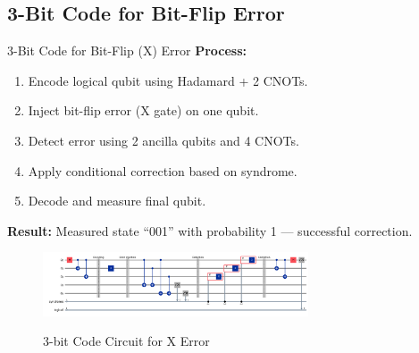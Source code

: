 \documentclass[10pt]{beamer}
\begin{document}

\subsection{3-Bit Code for Bit-Flip Error}
\begin{frame}{3-Bit Code for Bit-Flip (X) Error}
\textbf{Process:}
\begin{enumerate}
    \item Encode logical qubit using Hadamard + 2 CNOTs.
    \item Inject bit-flip error (X gate) on one qubit.
    \item Detect error using 2 ancilla qubits and 4 CNOTs.
    \item Apply conditional correction based on syndrome.
    \item Decode and measure final qubit.
\end{enumerate}

\vspace{0.3cm}
\textbf{Result:} Measured state “001” with probability 1 — successful correction.

\begin{figure}
  
  \centering
  \includegraphics[width=0.7\textwidth]{../../Codes/results/3bitCode/3bitCodeCircuit.png} \\[4pt]
  \caption{3-bit Code Circuit for X Error}
\end{figure}
\end{frame}
\end{document}
